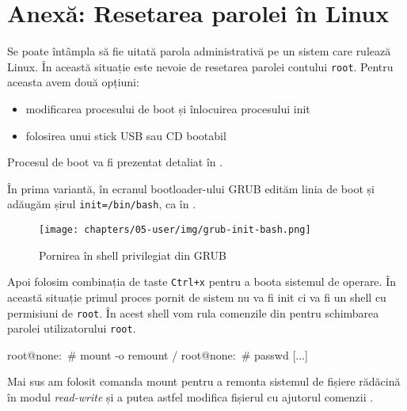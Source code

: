 
\section{Anexă: Resetarea parolei în Linux}
\label{sec:user:linux-password-recovery}

Se poate întâmpla să fie uitată parola administrativă pe un sistem care rulează
Linux. În această situație este nevoie de resetarea parolei contului \texttt{root}.
Pentru aceasta avem două opțiuni:

\begin{itemize}
  \item modificarea procesului de boot și înlocuirea procesului init
  \item folosirea unui stick USB  sau CD
    bootabil
\end{itemize}

Procesul de boot va fi prezentat detaliat în .

În prima variantă, în ecranul bootloader-ului GRUB  edităm linia de boot și
adăugăm șirul \texttt{init=/bin/bash}, ca în .

\begin{figure}[!htbp]
  \centering
  \texttt{[image: chapters/05-user/img/grub-init-bash.png]}
  \caption{Pornirea în shell privilegiat din GRUB}
  \label{fig:user:grub-init-bash}
\end{figure}

Apoi folosim combinația de taste \texttt{Ctrl+x} pentru a boota sistemul de operare. În
această situație primul proces pornit de sistem nu va fi init ci va fi un shell
cu permisiuni de \texttt{root}. În acest shell vom rula comenzile din  pentru
schimbarea parolei utilizatorului \texttt{root}.

\begin{screen}[caption={Schimbarea parolei contului root în shellul privilegiat},label={lst:user:change-root-pw}]
root@none:~# mount -o remount /
root@none:~# passwd
[...]
\end{screen}

Mai sus am folosit comanda mount pentru a remonta sistemul de fișiere rădăcină
în modul \textit{read-write} și a putea astfel modifica fișierul  cu ajutorul
comenzii .

